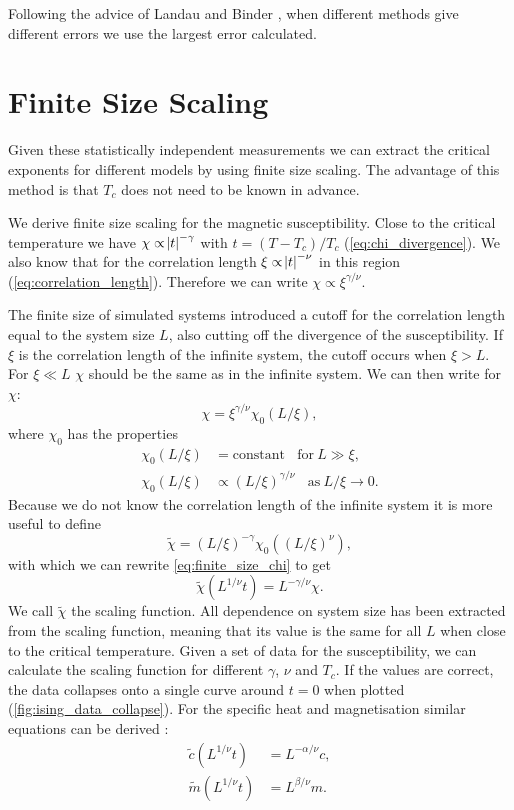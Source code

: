 \documentclass[11pt, a4paper]{report} %
\begin{document}
Following the advice of Landau and Binder \cite{landau:2015}, when different methods give different errors we use the largest error calculated.


\section{Finite Size Scaling}
Given these statistically independent measurements we can extract the critical exponents for different models by using finite size scaling.
The advantage of this method is that \(T_c\) does not need to be known in advance.

We derive finite size scaling for the magnetic susceptibility.
Close to the critical temperature we have \(\chi \propto \abs{t} ^{-\gamma}\) with \(t = (T-T_c) / T_c\) (\cref{eq:chi_divergence}).
We also know that for the correlation length \(\xi \propto \abs{t}^{-\nu}\) in this region (\cref{eq:correlation_length}).
Therefore we can write \(\chi \propto \xi^{\gamma /\nu}\).

The finite size of simulated systems introduced a cutoff for the correlation length equal to the system size \(L\), also cutting off the divergence of the susceptibility.
If \(\xi\) is the correlation length of the infinite system, the cutoff occurs when \(\xi > L\).
For \(\xi \ll L\) \(\chi\) should be the same as in the infinite system.
We can then write for \(\chi\):
\begin{equation}\label{eq:finite_size_chi}
	\chi = \xi^{\gamma/\nu} \chi_0(L/\xi),
\end{equation}
where \(\chi_0\) has the properties
\begin{align}
	\chi_0(L/\xi) &= \mathrm{constant}\ \ \ \ \mathrm{for}\ L \gg \xi,\\
	\chi_0(L/\xi) &\propto (L/\xi)^{\gamma/\nu}\ \ \ \ \mathrm{as}\ L/\xi \to 0.
\end{align}
Because we do not know the correlation length of the infinite system it is more useful to define
\begin{equation}
	\tilde{\chi} = (L/\xi)^{-\gamma} \chi_0((L/\xi)^{\nu}),
\end{equation}
with which we can rewrite \cref{eq:finite_size_chi} to get
\begin{equation}
	\tilde{\chi}(L^{1/\nu}t) = L^{-\gamma/\nu}\chi.
\end{equation}
We call \(\tilde{\chi}\) the scaling function.
All dependence on system size has been extracted from the scaling function, meaning that its value is the same for all \(L\) when close to the critical temperature.
Given a set of data for the susceptibility, we can calculate the scaling function for different \(\gamma\), \(\nu\) and \(T_c\).
If the values are correct, the data collapses onto a single curve around \(t=0\) when plotted (\cref{fig:ising_data_collapse}).
For the specific heat and magnetisation similar equations can be derived \cite{newman:1999}:
\begin{align}
	\widetilde{c}(L^{1/\nu}t) &= L^{-\alpha/\nu} c, \\
	\widetilde{m}(L^{1/\nu}t) &= L^{\beta/\nu} m.\label{eq:magnetisation_scaling}
\end{align}
\end{document}
